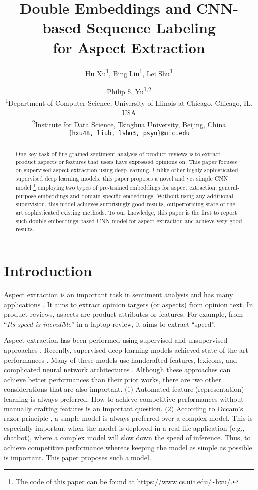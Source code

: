\documentclass[11pt,a4paper]{article}
\title{Double Embeddings and CNN-based Sequence Labeling\\for Aspect Extraction}
\author{Hu Xu\textsuperscript{1}, Bing Liu\textsuperscript{1}, Lei Shu\textsuperscript{1}\and Philip S. Yu\textsuperscript{1,2}\\
\textsuperscript{1}{Department of Computer Science, University of Illinois at Chicago, Chicago, IL, USA}\\
\textsuperscript{2}{Institute for Data Science, Tsinghua University, Beijing, China}\\
{\tt \{hxu48, liub, lshu3, psyu\}@uic.edu}
}
\date{}
\begin{document}
\maketitle
\begin{abstract}
One key task of fine-grained sentiment analysis of product reviews is to extract product aspects or features that users have expressed opinions on. This paper focuses on supervised aspect extraction using deep learning. Unlike other highly sophisticated supervised deep learning models, this paper proposes a novel and yet simple CNN model \footnote{The code of this paper can be found at \url{https://www.cs.uic.edu/~hxu/}.} employing two types of pre-trained embeddings for aspect extraction: general-purpose embeddings and domain-specific embeddings. Without using any additional supervision, this model achieves surprisingly good results, outperforming state-of-the-art sophisticated existing methods. To our knowledge, this paper is the first to report such double embeddings based CNN model for aspect extraction and achieve very good results. 



\end{abstract}

\section{Introduction}
Aspect extraction is an important task in sentiment analysis \cite{HuL2004} and has many applications \cite{Liu2012}.
It aims to extract opinion targets (or aspects) from opinion text. 
In product reviews, aspects are product attributes or features. 
For example, from ``\textit{Its speed is incredible}'' in a laptop review, it aims to extract ``speed''. 

Aspect extraction has been performed using supervised \cite{Jakob2010,chernyshevich2014ihs,shu2017lifelong} and unsupervised approaches \cite{HuL2004, ZhuangJZ2006,MeiLWSZ2007,QiuLBC2011,yin2016unsupervised,he2017unsupervised}. 
Recently, supervised deep learning models achieved state-of-the-art performances \cite{li2017deep}. Many of these models use handcrafted features, lexicons, and complicated neural network architectures \cite{poria2016aspect,wang2016recursive,wang2017coupled,li2017deep}. 
Although these approaches can achieve better performances than their prior works, there are two other considerations that are also important.
(1) Automated feature (representation) learning is always preferred. 
How to achieve competitive performances without manually crafting features is an important question. 
(2) According to Occam's razor principle \cite{blumer1987occam}, a simple model is always preferred over a complex model.
This is especially important when the model is deployed in a real-life application (e.g., chatbot), where a complex model will slow down the speed of inference. Thus, to achieve competitive performance whereas keeping the model as simple as possible is important. This paper proposes such a model. 
\end{document}
